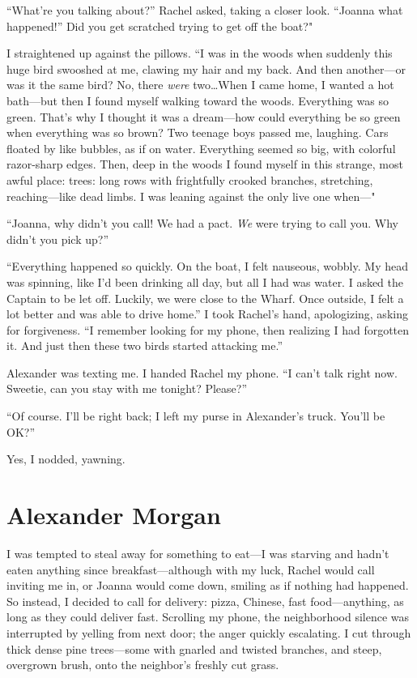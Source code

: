 ``What're you talking about?'' Rachel asked, taking a closer look.
``Joanna what happened!'' Did you get scratched trying to get off the
boat?"

I straightened up against the pillows. ``I was in the woods when suddenly
this huge bird swooshed at me, clawing my hair and my back. And then
another---or was it the same bird? No, there \emph{were} two\ldots When
I came home, I wanted a hot bath---but then I found myself walking
toward the woods. Everything was so green. That's why I thought it was a
dream---how could everything be so green when everything was so brown?
Two teenage boys passed me, laughing. Cars floated by like bubbles, as
if on water. Everything seemed so big, with colorful razor-sharp edges.
Then, deep in the woods I found myself in this strange, most awful
place: trees: long rows with frightfully crooked branches, stretching,
reaching---like dead limbs. I was leaning against the only live one
when---"

``Joanna, why didn't you call! We had a pact. \emph{We} were trying to
call you. Why didn't you pick up?''

``Everything happened so quickly. On the boat, I felt nauseous, wobbly.
My head was spinning, like I'd been drinking all day, but all I had was
water. I asked the Captain to be let off. Luckily, we were close to the
Wharf. Once outside, I felt a lot better and was able to drive home.'' I
took Rachel's hand, apologizing, asking for forgiveness. ``I remember
looking for my phone, then realizing I had forgotten it. And just then
these two birds started attacking me.''

Alexander was texting me. I handed Rachel my phone. ``I can't talk right
now. Sweetie, can you stay with me tonight? Please?''

``Of course. I'll be right back; I left my purse in Alexander's truck.
You'll be OK?''

Yes, I nodded, yawning.

\chapter{Alexander Morgan}

\titlemark

I was tempted to steal away for something to eat---I was starving and
hadn't eaten anything since breakfast---although with my luck, Rachel
would call inviting me in, or Joanna would come down, smiling as if
nothing had happened. So instead, I decided to call for delivery: pizza,
Chinese, fast food---anything, as long as they could deliver fast.
Scrolling my phone, the neighborhood silence was interrupted by yelling
from next door; the anger quickly escalating. I cut through thick dense
pine trees---some with gnarled and twisted branches, and steep,
overgrown brush, onto the neighbor's freshly cut grass.

